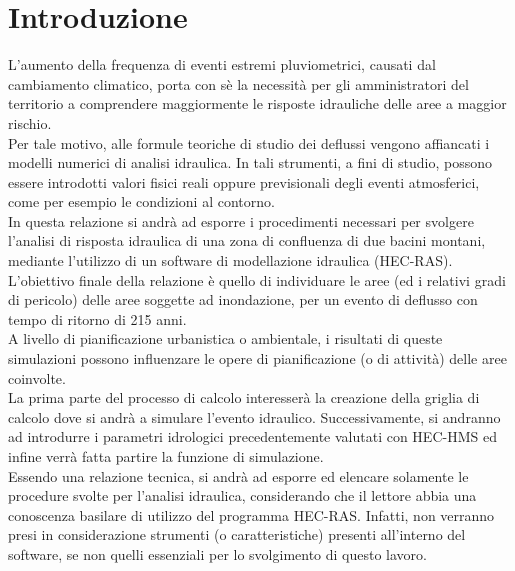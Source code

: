 \section{Introduzione}
L'aumento della frequenza di eventi estremi pluviometrici, causati dal cambiamento climatico, porta con sè la necessità per gli amministratori del territorio a comprendere maggiormente le risposte idrauliche delle aree a maggior rischio.\\
Per tale motivo, alle formule teoriche di studio dei deflussi vengono affiancati i modelli numerici di analisi idraulica. In tali strumenti, a fini di studio, possono essere introdotti valori fisici reali oppure previsionali degli eventi atmosferici, come per esempio le condizioni al contorno.\\ 
In questa relazione si andrà ad esporre i procedimenti necessari per svolgere l'analisi di risposta idraulica di una zona di confluenza di due bacini montani, mediante l'utilizzo di un software di modellazione idraulica (HEC-RAS). L'obiettivo finale della relazione è quello di individuare le aree (ed i relativi gradi di pericolo) delle aree soggette ad inondazione, per un evento di deflusso con tempo di ritorno di 215 anni.\\
A livello di pianificazione urbanistica o ambientale, i risultati di queste simulazioni possono influenzare le opere di pianificazione (o di attività) delle aree coinvolte.\\
La prima parte del processo di calcolo interesserà la creazione della griglia di calcolo dove si andrà a simulare l'evento idraulico. Successivamente, si andranno ad introdurre i parametri idrologici precedentemente valutati con HEC-HMS ed infine verrà fatta partire la funzione di simulazione.\\
Essendo una relazione tecnica, si andrà ad esporre ed elencare solamente le procedure svolte per l'analisi idraulica, considerando che il lettore abbia una conoscenza basilare di utilizzo del programma HEC-RAS. Infatti, non verranno presi in considerazione strumenti (o caratteristiche) presenti all'interno del software, se non quelli essenziali per lo svolgimento di questo lavoro.